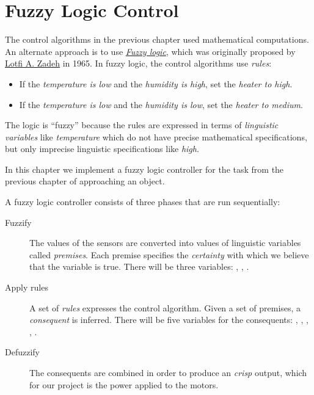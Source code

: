 \chapter{Fuzzy Logic Control}\label{ch.fuzzy}

The control algorithms in the previous chapter used mathematical
computations. An alternate approach is to use
\href{http://en.wikipedia.org/wiki/Fuzzy_logic}{\emph{Fuzzy logic}}, which was originally proposed by
\href{http://en.wikipedia.org/wiki/Lotfi_A._Zadeh}{Lotfi A. Zadeh} in
1965. In fuzzy logic, the control algorithms use \emph{rules}:

\begin{itemize}
\item If the \emph{temperature is low} and the \emph{humidity is high},
set the \emph{heater to high}.
\item If the \emph{temperature is low} and the \emph{humidity is low},
set the \emph{heater to medium}.
\end{itemize}

The logic is ``fuzzy'' because the rules are expressed in terms of
\emph{linguistic variables} like \emph{temperature} which do not have
precise mathematical specifications, but only imprecise linguistic
specifications like \emph{high}.

In this chapter we implement a fuzzy logic controller for
the task from the previous chapter of approaching an object.



A fuzzy logic controller consists of three phases that are run
 sequentially:

\begin{description}

\item[Fuzzify] The values of the sensors are converted into values of
linguistic variables called \emph{premises}. Each premise specifies the
\emph{certainty} with which we believe that the variable is true. There
will be three variables: , , .

\item[Apply rules] A set of \emph{rules} expresses the control
algorithm. Given a set of premises, a \emph{consequent} is inferred.
There will be five variables for the consequents: ,
, , , .

\item[Defuzzify] The consequents are combined in order to produce an
\emph{crisp} output, which for our project is the power applied to the
motors.

\end{description}


